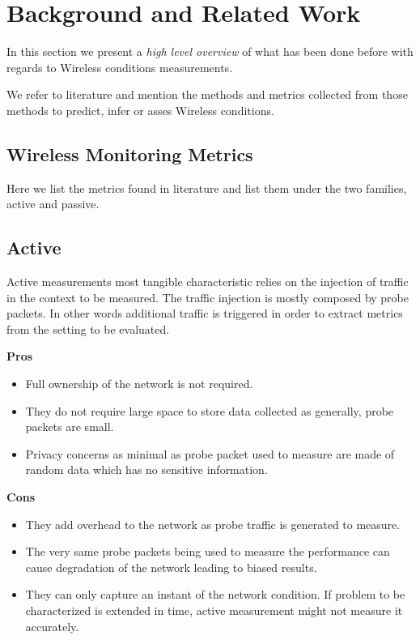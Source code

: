 \section{Background and Related Work}\label{Back_Related_Work}

In this section we present a \emph{high level overview} of what has been done before with regards to Wireless conditions measurements.

We refer to literature and mention the methods and metrics collected from those methods to predict, infer or asses Wireless conditions.

\subsection{Wireless Monitoring Metrics}

Here we list the metrics found in literature and list them under the two families, active and passive.

\subsection*{Active}

Active measurements most tangible characteristic relies on the injection of traffic in the context to be measured. The traffic injection is mostly composed by probe packets. In other words additional traffic is triggered in order to extract metrics from the setting to be evaluated.

\textbf{Pros}
\begin{itemize}
	\item Full ownership of the network is not required.
	\item They do not require large space to store data collected as generally, probe packets are small.
	\item Privacy concerns as minimal as probe packet used to measure are made of random data which has no sensitive information.
\end{itemize}
	

\textbf{Cons}
\begin{itemize}
	\item They add overhead to the network as probe traffic is generated to measure.
	\item The very same probe packets being used to measure the performance can cause degradation of the network leading to biased results.
	\item They can only capture an instant of the network condition. If problem to be characterized is extended in time, active measurement might not measure it accurately.
\end{itemize}

